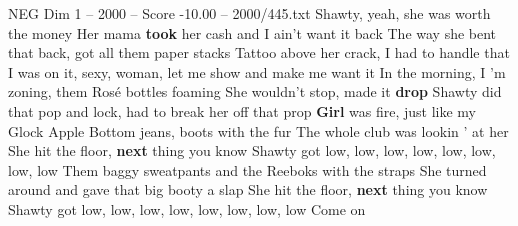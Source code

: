 \begin{textsample}{NEG Dim 1 – 2000 – Score -10.00 – 2000/445.txt}
Shawty, yeah, she was worth the money Her mama \textbf{took} her cash and I ain't want it back The way she bent that back, got all them paper stacks Tattoo above her crack, I had to handle that I was on it, sexy, woman, let me show and make me want it In the morning, I 'm zoning, them Rosé bottles foaming She wouldn't stop, made it \textbf{drop} Shawty did that pop and lock, had to break her off that prop \textbf{Girl} was fire, just like my Glock Apple Bottom jeans, boots with the fur The whole club was lookin ' at her She hit the floor, \textbf{next} thing you know Shawty got low, low, low, low, low, low, low, low Them baggy sweatpants and the Reeboks with the straps She turned around and gave that big booty a slap She hit the floor, \textbf{next} thing you know Shawty got low, low, low, low, low, low, low, low Come on

\end{textsample}
